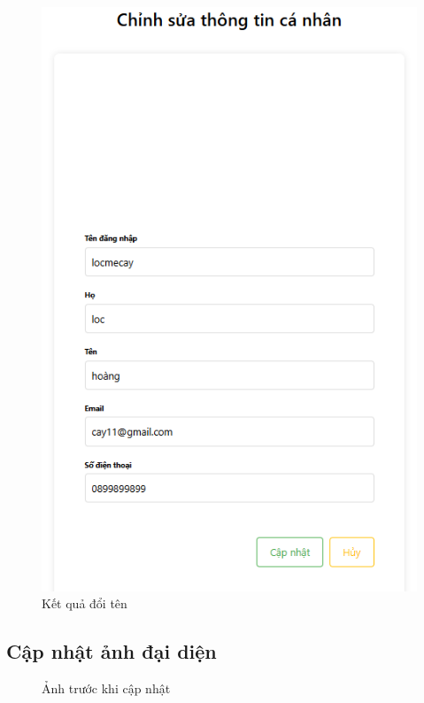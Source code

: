 \begin{figure}[H]
    \centering
    \includegraphics[width=1\textwidth]{img/instagram/kết quả đổi tên.png}
    \caption{Kết quả đổi tên}
\end{figure}

\FloatBarrier %
\subsection{Cập nhật ảnh đại diện}
\begin{figure}[H]
    \centering
    \caption{Ảnh trước khi cập nhật}
\end{figure}

